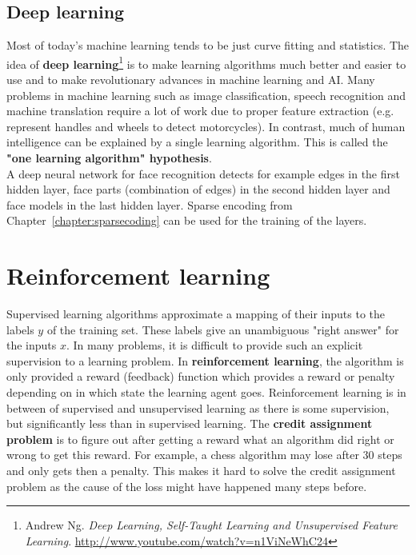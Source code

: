 \documentclass{report}
\begin{document}
\section{Deep learning}
Most of today's machine learning tends to be just curve fitting and statistics.
The idea of {\bf deep learning}\footnote{Andrew Ng. {\em Deep Learning, Self-Taught Learning and Unsupervised Feature Learning}. \url{http://www.youtube.com/watch?v=n1ViNeWhC24}} is to make learning algorithms much better and easier to use and to make revolutionary advances in machine learning and AI.
Many problems in machine learning such as image classification, speech recognition and machine translation require a lot of work due to proper feature extraction (e.g. represent handles and wheels to detect motorcycles).
In contrast, much of human intelligence can be explained by a single learning algorithm. This is called the {\bf "one learning algorithm" hypothesis}. \\
A deep neural network for face recognition detects for example edges in the first hidden layer, face parts (combination of edges) in the second hidden layer and face models in the last hidden layer.
Sparse encoding from Chapter~\ref{chapter:sparsecoding} can be used for the training of the layers.


\chapter{Reinforcement learning}
\label{chapter:reinforcementlearning}

Supervised learning algorithms approximate a mapping of their inputs to the labels $y$ of the training set.
These labels give an unambiguous "right answer" for the inputs $x$. In many problems, it is difficult to provide such an explicit supervision to a learning problem.
In {\bf reinforcement learning}, the algorithm is only provided a reward (feedback) function which provides a reward or penalty depending on in which state the learning agent goes.
Reinforcement learning is in between of supervised and unsupervised learning as there is some supervision, but significantly less than in supervised learning.
The {\bf credit assignment problem} is to figure out after getting a reward what an algorithm did right or wrong to get this reward.
For example, a chess algorithm may lose after 30 steps and only gets then a penalty.
This makes it hard to solve the credit assignment problem as the cause of the loss might have happened many steps before.
\end{document}
